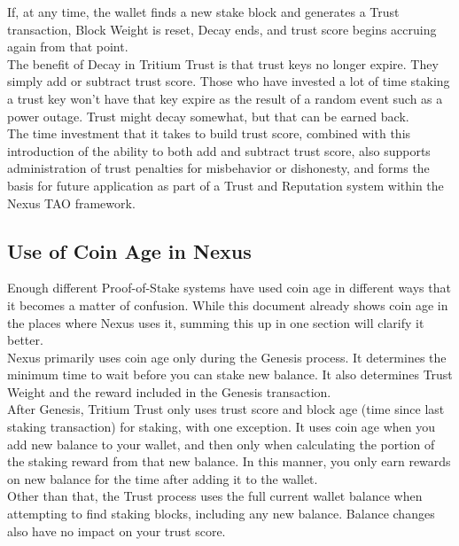 \documentclass[11pt]{article}
\begin{document}
\noindent If, at any time, the wallet finds a new stake block and generates a Trust transaction, Block Weight is reset, Decay ends, and trust score begins accruing again from that point. \\

\noindent The benefit of Decay in Tritium Trust is that trust keys no longer expire. They simply add or subtract trust score. Those who have invested a lot of time staking a trust key won’t have that key expire as the result of a random event such as a power outage. Trust might decay somewhat, but that can be earned back.\\

\noindent The time investment that it takes to build trust score, combined with this introduction of the ability to both add and subtract trust score, also supports administration of trust penalties for misbehavior or dishonesty, and forms the basis for future application as part of a Trust and Reputation system within the Nexus TAO framework.\\

\subsection{Use of Coin Age in Nexus}
Enough different Proof-of-Stake systems have used coin age in different ways that it becomes a matter of confusion. While this document already shows coin age in the places where Nexus uses it, summing this up in one section will clarify it better.\\

\noindent Nexus primarily uses coin age only during the Genesis process. It determines the minimum time to wait before you can stake new balance. It also determines Trust Weight and the  reward included in the Genesis transaction.\\

\noindent After Genesis, Tritium Trust only uses trust score and block age (time since last staking transaction) for staking, with one exception. It uses coin age when you add new balance to your wallet, and then only when calculating the portion of the staking reward from that new balance. In this manner, you only earn rewards on new balance for the time after adding it to the wallet.\\

\noindent Other than that, the Trust process uses the full current wallet balance when attempting to find staking blocks, including any new balance. Balance changes also have no impact on your trust score.\\
\end{document}
